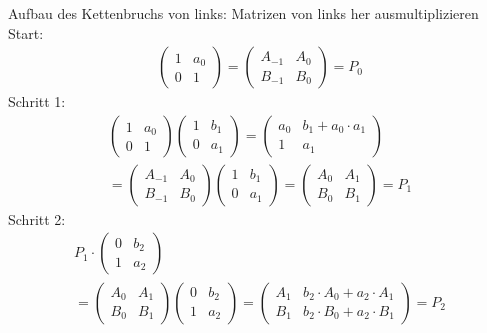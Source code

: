 Aufbau des Kettenbruchs von links: Matrizen von links her ausmultiplizieren
Start:
\begin{align*}
		\begin{pmatrix}
			1& a_0\\
			0& 1
		\end{pmatrix}
	=	\begin{pmatrix}
			A_{-1}& A_0\\
			B_{-1}& B_0
		\end{pmatrix}
	=	P_0
\end{align*}
Schritt 1:
\begin{align*}
		\begin{pmatrix}
			1& a_0\\
			0& 1
		\end{pmatrix}
		\begin{pmatrix}
			1& b_1\\
			0& a_1
		\end{pmatrix}
	=	\begin{pmatrix}
			a_0& b_1 + a_0 \cdot a_1\\
			1&	a_1
		\end{pmatrix}\\
	=	\begin{pmatrix}
			A_{-1}& A_0\\
			B_{-1}& B_0
		\end{pmatrix}
		\begin{pmatrix}
			1& b_1\\
			0& a_1
		\end{pmatrix}
	=	\begin{pmatrix}
			A_0& A_1\\
			B_0& B_1
		\end{pmatrix}
	=	P_1
\end{align*}
Schritt 2:
\begin{align*}
P_1 \cdot	\begin{pmatrix}
				0& b_2\\
				1& a_2
			\end{pmatrix}\\
		=	\begin{pmatrix}
				A_0& A_1\\
				B_0& B_1
			\end{pmatrix}
			\begin{pmatrix}
				0& b_2\\
				1& a_2
			\end{pmatrix}
		=	\begin{pmatrix}
				A_1& b_2 \cdot A_0 + a_2 \cdot A_1\\
				B_1& b_2 \cdot B_0 + a_2 \cdot B_1
			\end{pmatrix}
		= 	P_2
\end{align*}
